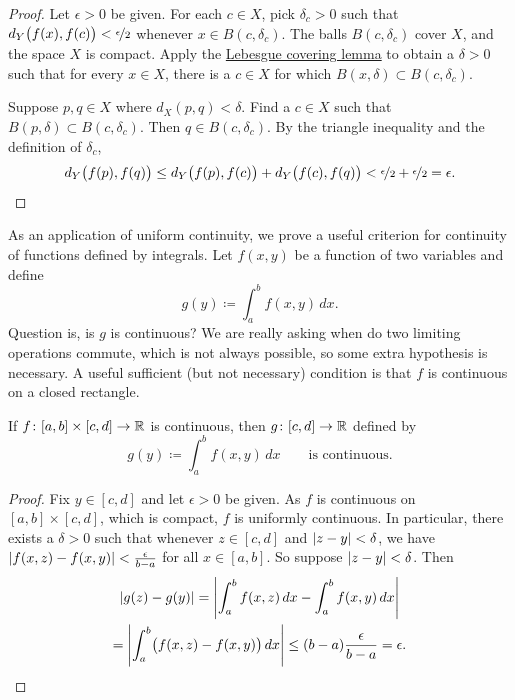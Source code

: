 \begin{proof}
Let $\epsilon > 0$ be given.  For each $c \in X$, pick $\delta_c > 0$ such that
$d_Y\bigl(f(x),f(c)\bigr) < \nicefrac{\epsilon}{2}$
whenever
$x \in B(c,\delta_c)$.
The balls
$B(c,\delta_c)$ cover $X$, and the space $X$ is compact.  
Apply the \hyperref[ms:lebesgue]{Lebesgue covering lemma} to obtain a 
$\delta > 0$ such that for every $x \in X$, there is a $c \in X$
for which $B(x,\delta) \subset B(c,\delta_c)$.

Suppose $p, q \in X$ where $d_X(p,q) < \delta$.
Find a $c \in X$ such that $B(p,\delta) \subset B(c,\delta_c)$.
Then $q \in B(c,\delta_c)$.  By the triangle inequality
and the definition of $\delta_c$,
\begin{equation*}
d_Y\bigl(f(p),f(q)\bigr)
\leq
d_Y\bigl(f(p),f(c)\bigr)
+
d_Y\bigl(f(c),f(q)\bigr)
<
\nicefrac{\epsilon}{2}+
\nicefrac{\epsilon}{2} = \epsilon .  \qedhere
\end{equation*}
\end{proof}

As an application of uniform continuity,
we prove a useful criterion for
continuity of functions defined by integrals.
Let $f(x,y)$ be a function of two variables and define
\begin{equation*}
g(y) \coloneqq \int_a^b f(x,y) \,dx .
\end{equation*}
Question is, is $g$ is continuous?
We are really asking when do two limiting operations commute,
which is not always possible, so some extra hypothesis
is necessary.  A useful sufficient (but not
necessary) condition is that $f$ is continuous on a closed rectangle.

\begin{prop} \label{prop:integralcontcont}
If $f \colon [a,b] \times [c,d] \to {\mathbb{R}}$ is continuous,
then $g \colon [c,d] \to {\mathbb{R}}$ defined by
\begin{equation*}
g(y) \coloneqq \int_a^b f(x,y) \,dx  \qquad \text{is continuous}.
\end{equation*}
\end{prop}

\begin{proof}
Fix $y \in [c,d]$ and
let $\epsilon > 0$ be given.
As $f$ is continuous on $[a,b] \times [c,d]$, which is compact, $f$
is uniformly continuous.  
In particular, there exists a $\delta > 0$ such that
whenever $z \in [c,d]$ and
$\left\lvert {z-y} \right\rvert < \delta$, we have
$\left\lvert {f(x,z)-f(x,y)} \right\rvert < \frac{\epsilon}{b-a}$ for all $x \in [a,b]$.
So suppose $\left\lvert {z-y} \right\rvert < \delta$.  Then
\begin{multline*}
\left\lvert {
g(z)-
g(y)
} \right\rvert
=
\left\lvert {
\int_a^b 
f(x,z) \,dx 
-
\int_a^b 
f(x,y) \,dx 
} \right\rvert
\\
=
\left\lvert {
\int_a^b 
\bigl(
f(x,z) - f(x,y)
\bigr)
\,dx 
} \right\rvert
\leq
(b-a)
\frac{\epsilon}{b-a}
= \epsilon . \qedhere
\end{multline*}
\end{proof}

